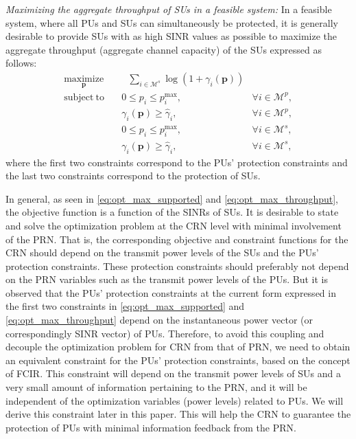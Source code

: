 \documentclass[journal,twoside]{IEEEtran}
\newcommand{\M}{\mathcal{M}}
\newcommand{\pimax}{p_i^{\mathrm{max}}}
\newcommand{\pbold}{\mathbf{p}}
\newcommand{\gammai}{\gamma_i}
\newcommand{\gammaihat}{\mathit{\widehat{\gamma}}_i}
\begin{document}
		\textit{Maximizing the aggregate throughput of SUs in a feasible system: }
		In a feasible system, where all PUs and SUs can simultaneously be protected, it is generally desirable to provide SUs with as high SINR values as possible to maximize the aggregate throughput (aggregate channel capacity) of the SUs expressed as follows:
\begin{align}
			\label{eq:opt_max_throughput}
			\underset{\pbold}{\mathrm{maximize}}& \ \ \ \sum_{i\in\M^s}{\log(1+\gammai(\pbold)) }    \nonumber \\
		\mathrm{subject\ to}\quad & 0\leq p_i \leq \pimax, & \forall i\in\M^p,
		\nonumber \\
		&  \gammai(\pbold)\geq \gammaihat,  & \forall i\in\M^p,
		\nonumber \\
		& 0\leq p_i \leq \pimax, & \forall i\in\M^s,
\nonumber \\
		&  \gammai(\pbold)\geq \gammaihat,  & \forall i\in\M^s,
		\end{align}
		where the first two constraints correspond to the PUs' protection constraints and the last two constraints correspond to the protection of SUs. 
	

	In general, as seen in \eqref{eq:opt_max_supported} and \eqref{eq:opt_max_throughput}, the objective function is  a function of the SINRs of SUs. It is desirable to state and solve the optimization problem at the CRN level with minimal involvement of the PRN. That is, the corresponding objective and constraint functions for the CRN should depend on the transmit power levels of the SUs and the PUs' protection constraints. These protection constraints should preferably not depend on the PRN  variables such as the  transmit power levels of the PUs. 
	But it is observed that the PUs' protection constraints at the current form expressed in the  first two constraints in \eqref{eq:opt_max_supported} and \eqref{eq:opt_max_throughput} depend on the instantaneous power vector (or correspondingly SINR vector) of PUs.
	Therefore, to avoid this coupling and decouple the optimization problem for CRN from that of PRN,
we	need to obtain an equivalent constraint for the PUs' protection constraints, based on the concept of FCIR. This constraint will depend on the transmit power levels of SUs and a very small amount of information pertaining to the PRN, and it will be independent of the optimization variables (power levels) related to PUs. We will derive this constraint later in this paper. This will help the CRN to guarantee the protection of PUs with minimal information feedback from the PRN. 
	
\end{document}
